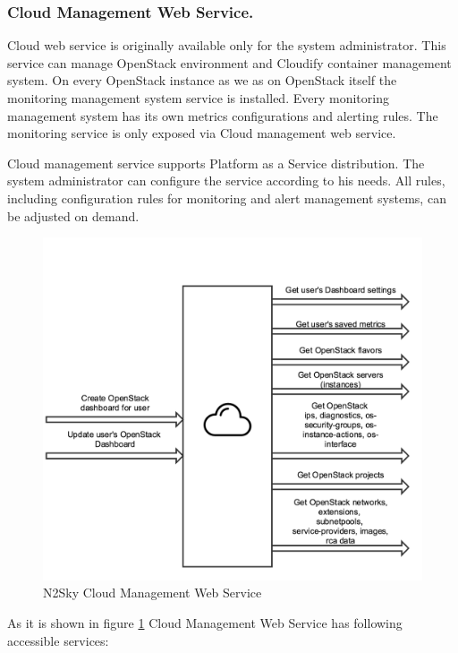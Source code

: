 \subsubsection{Cloud Management Web Service.}\label{Cloud management Web Service}  Cloud web service is originally available only for the system administrator. This service can manage OpenStack environment and Cloudify container management system. On every OpenStack instance as we as on OpenStack itself the monitoring management system service is installed. Every monitoring management system has its own metrics configurations and alerting rules. The monitoring service is only exposed via Cloud management web service. 
 
 Cloud management service supports Platform as a Service distribution. The system administrator can configure the service according to his needs. All rules, including configuration rules for monitoring and alert management systems, can be adjusted on demand.  
 
 
\begin{figure}[htbp]
\begin{center}
  \includegraphics[width=\linewidth]{components/3/components/cloud_service.png}
  \caption{N2Sky Cloud Management Web Service}
  \label{fig:cloud_service}
\end{center}
\end{figure}

 
 As it is shown in figure \ref{fig:cloud_service} Cloud Management Web Service has following accessible services:


